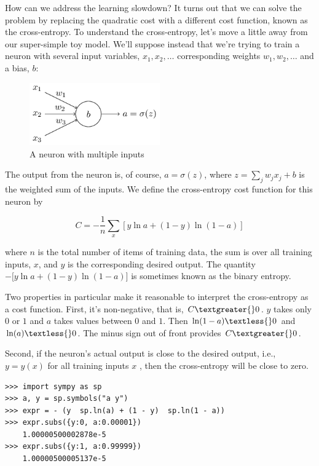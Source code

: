 \documentclass[12 pt]{article}
\begin{document}
How can we address the learning slowdown? It turns out that we can solve
the problem by replacing the quadratic cost with a different cost
function, known as the cross-entropy. To understand the cross-entropy,
let's move a little away from our super-simple toy model. We'll suppose
instead that we're trying to train a neuron with several input
variables, $ x_1, x_2, \ldots{} $ corresponding weights $ w_1,
w_2, \ldots{} $ and a bias, $ b $:

\begin{figure}[htp]
\centering
\includegraphics[width=0.5\textwidth]{./figs/tikz29.png}
\caption{A neuron with multiple inputs}
\end{figure}

The output from the neuron is, of course, $ a = \sigma(z) $, where $ z
= \sum_j w_j x_j + b $ is the weighted sum of the inputs. We
define the cross-entropy cost function for this neuron by

\begin{equation}
    C = -\frac{1}{n} \sum_x [y \ln a + (1 - y) \ln (1 - a)]
\end{equation}

where $ n $ is the total number of items of training data, the sum is
over all training inputs, $ x $, and $ y $ is the corresponding
desired output. The quantity $ -{[}y \ln a + (1 - y) \ln (1 - a){]} $
is sometimes known as the binary entropy.

Two properties in particular make it reasonable to interpret the
cross-entropy as a cost function. First, it's non-negative, that is, $
C \textgreater{} 0 $. $ y $ takes only $ 0 $ or $ 1 $ and $ a $
takes values between $ 0 $ and $ 1 $. Then $ \ln(1 - a) \textless{} 0
$ and $ \ln(a) \textless{} 0 $. The minus sign out of front provides $
C \textgreater{} 0 $.

Second, if the neuron's actual output is close to the desired output,
i.e., $ y = y(x) $ for all training inputs $ x $ , then the
cross-entropy will be close to zero.

\begin{verbatim}
>>> import sympy as sp
>>> a, y = sp.symbols("a y")
>>> expr = - (y  sp.ln(a) + (1 - y)  sp.ln(1 - a))
>>> expr.subs({y:0, a:0.00001})
    1.00000500002878e-5
>>> expr.subs({y:1, a:0.99999})
    1.00000500005137e-5
\end{verbatim}
\end{document}
